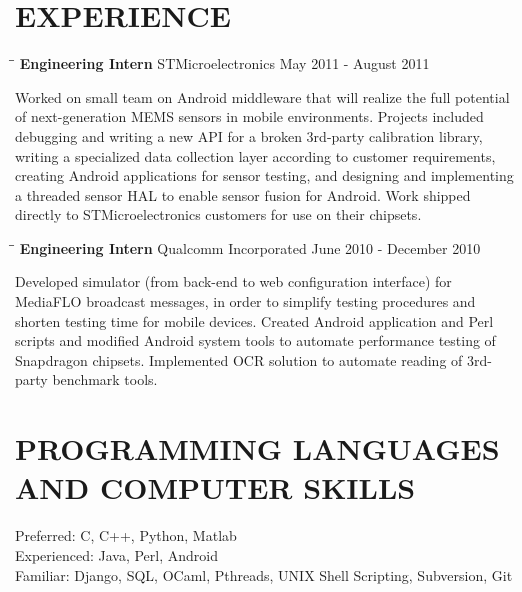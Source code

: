 \documentclass{res}
\begin{document}
\begin{resume}
\section{EXPERIENCE}
   \vspace{-0.1in}	
   \begin{tabbing}
   \hspace{2.3in}\= \hspace{2.6in}\= \kill %
    {\bf Engineering Intern} \>STMicroelectronics     \>May 2011 - August 2011\\
   \end{tabbing}\vspace{-30pt}      %
   Worked on small team on Android middleware that will realize the full potential of next-generation MEMS sensors in mobile environments. Projects included debugging and writing a new API for a broken 3rd-party calibration library, writing a specialized data collection layer according to customer requirements, creating Android applications for sensor testing, and designing and implementing a threaded sensor HAL to enable sensor fusion for Android. Work shipped directly to STMicroelectronics customers for use on their chipsets.
    \vspace{-10pt}
   \begin{tabbing}
   \hspace{2.3in}\= \hspace{2.6in}\= \kill %
    {\bf Engineering Intern} \>Qualcomm Incorporated     \>June 2010 - December 2010\\
   \end{tabbing}\vspace{-30pt}      %
   Developed simulator (from back-end to web configuration interface) for MediaFLO broadcast messages, in order to simplify testing procedures and shorten testing time for mobile devices. Created Android application and Perl scripts and modified Android system tools to automate performance testing of Snapdragon chipsets. Implemented OCR solution to automate reading of 3rd-party benchmark tools.
    
   
\section{PROGRAMMING LANGUAGES AND COMPUTER SKILLS}          
      Preferred: C, C++, Python, Matlab \\
      Experienced: Java, Perl, Android \\
      Familiar: Django, SQL, OCaml, Pthreads, UNIX Shell Scripting, Subversion, Git
\pagebreak

\end{resume}
\end{document}

